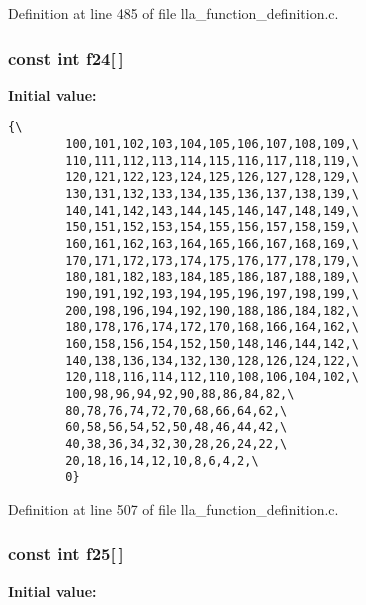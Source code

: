 Definition at line 485 of file lla\_\-function\_\-definition.c.
\subsubsection{\setlength{\rightskip}{0pt plus 5cm}const int {\bf f24}[$\,$]}\label{lla__function__definition_8c_a23}


{\bf Initial value:}

\footnotesize\begin{verbatim}{\
        100,101,102,103,104,105,106,107,108,109,\
        110,111,112,113,114,115,116,117,118,119,\
        120,121,122,123,124,125,126,127,128,129,\
        130,131,132,133,134,135,136,137,138,139,\
        140,141,142,143,144,145,146,147,148,149,\
        150,151,152,153,154,155,156,157,158,159,\
        160,161,162,163,164,165,166,167,168,169,\
        170,171,172,173,174,175,176,177,178,179,\
        180,181,182,183,184,185,186,187,188,189,\
        190,191,192,193,194,195,196,197,198,199,\
        200,198,196,194,192,190,188,186,184,182,\
        180,178,176,174,172,170,168,166,164,162,\
        160,158,156,154,152,150,148,146,144,142,\
        140,138,136,134,132,130,128,126,124,122,\
        120,118,116,114,112,110,108,106,104,102,\
        100,98,96,94,92,90,88,86,84,82,\
        80,78,76,74,72,70,68,66,64,62,\
        60,58,56,54,52,50,48,46,44,42,\
        40,38,36,34,32,30,28,26,24,22,\
        20,18,16,14,12,10,8,6,4,2,\
        0}
\end{verbatim}\normalsize 


Definition at line 507 of file lla\_\-function\_\-definition.c.
\subsubsection{\setlength{\rightskip}{0pt plus 5cm}const int {\bf f25}[$\,$]}\label{lla__function__definition_8c_a24}


{\bf Initial value:}

